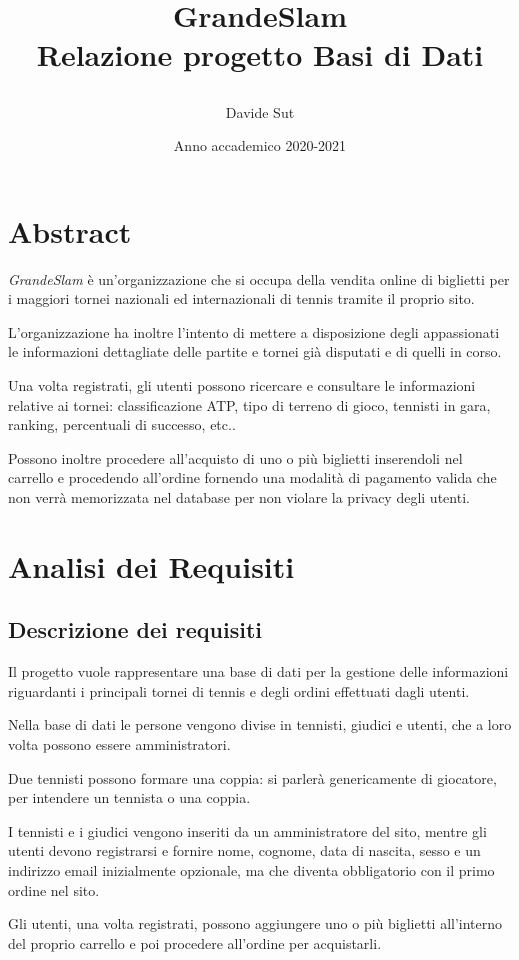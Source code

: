 \documentclass[10pt]{article}
\title{
    \begin{center}
        \textbf{GrandeSlam} \\
       \small Relazione progetto Basi di Dati
    \end{center}
}
\author{Davide Sut}
\date{Anno accademico 2020-2021}
\newcommand{\spazia}{\par\medskip}
\begin{document}
\maketitle
\pagebreak
\section{Abstract}
\textit{GrandeSlam} è un'organizzazione che si occupa della vendita online di biglietti per i maggiori tornei nazionali ed internazionali di tennis tramite il proprio sito.

L'organizzazione ha inoltre l'intento di mettere a disposizione degli appassionati le informazioni dettagliate delle partite e tornei già disputati e di quelli in corso.

Una volta registrati, gli utenti possono ricercare e consultare le informazioni relative ai tornei: classificazione ATP, tipo di terreno di gioco, tennisti in gara, ranking, percentuali di successo, etc..

Possono inoltre procedere all'acquisto di uno o più biglietti inserendoli nel carrello e procedendo all'ordine fornendo una modalità di pagamento valida che non verrà memorizzata nel database per non violare la privacy degli utenti.


\section{Analisi dei Requisiti}

\subsection{Descrizione dei requisiti}
Il progetto vuole rappresentare una base di dati per la gestione delle informazioni riguardanti i principali tornei di tennis e degli ordini effettuati dagli utenti.\spazia

Nella base di dati le persone vengono divise in tennisti, giudici e utenti, che a loro volta possono essere amministratori.

Due tennisti possono formare una coppia: si parlerà genericamente di giocatore, per intendere un tennista o una coppia.

I tennisti e i giudici vengono inseriti da un amministratore del sito, mentre gli utenti devono registrarsi e fornire nome, cognome, data di nascita, sesso e un indirizzo email inizialmente opzionale, ma che diventa obbligatorio con il primo ordine nel sito.\spazia

Gli utenti, una volta registrati, possono aggiungere uno o più biglietti all'interno del proprio carrello e poi procedere all'ordine per acquistarli.
\end{document}
